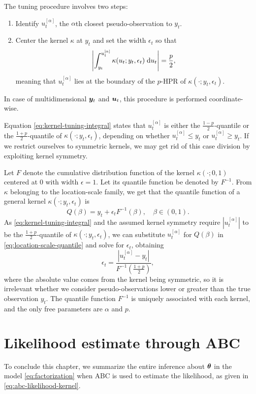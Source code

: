 The tuning procedure involves two steps:
\begin{enumerate}
    \item Identify $u_t^{[\alpha]}$, the $\alpha$th closest pseudo-observation to $y_t$.
    \item Center the kernel $\kappa$ at $y_t$ and set the width $\epsilon_t$ so that
    \begin{equation} \label{eq:kernel-tuning-integral}
    \left| \int_{y_t}^{u_t^{[\alpha]}} \kappa(u_t; y_t, \epsilon_t) \; \mathrm{d}{u_t} \right| = \frac{p}{2},
    \end{equation}
    meaning that $u_t^{[\alpha]}$ lies at the boundary of the $p$-HPR of $\kappa(\cdot; y_t, \epsilon_t)$.
\end{enumerate}
In case of multidimensional $\bm{y}_t$ and $\bm{u}_t$, this procedure is performed coordinate-wise.

Equation \eqref{eq:kernel-tuning-integral} states that $u_t^{[\alpha]}$ is either the $\frac{1-p}{2}$-quantile or the $\frac{1+p}{2}$-quantile of $\kappa(\cdot; y_t, \epsilon_t)$, depending on whether $u_t^{[\alpha]} \leq y_t$ or $u_t^{[\alpha]} \geq y_t$. If we restrict ourselves to symmetric kernels, we may get rid of this case division by exploiting kernel symmetry.

Let $F$ denote the cumulative distribution function of the kernel $\kappa(\cdot; 0, 1)$ centered at 0 with width $\epsilon = 1$. Let its quantile function be denoted by $F^{-1}$. From $\kappa$ belonging to the location-scale family, we get that the quantile function of a general kernel $\kappa(\cdot; y_t, \epsilon_t)$ is
\begin{equation} \label{eq:location-scale-quantile}
Q(\beta) = y_t + \epsilon_t F^{-1}(\beta), \quad \beta \in \left(0, 1\right).
\end{equation}
As \eqref{eq:kernel-tuning-integral} and the assumed kernel symmetry require $\left| u_t^{[\alpha]} \right|$ to be the $\frac{1+p}{2}$-quantile of $\kappa(\cdot; y_t, \epsilon_t)$, we can substitute $u_t^{[\alpha]}$ for $Q(\beta)$ in \eqref{eq:location-scale-quantile} and solve for $\epsilon_t$, obtaining
\begin{equation} \label{eq:kernel-tuning}
\epsilon_t = \frac{\left| u_t^{[\alpha]} - y_t \right|}{F^{-1}(\frac{1+p}{2})},
\end{equation}
where the absolute value comes from the kernel being symmetric, so it is irrelevant whether we consider pseudo-observations lower or greater than the true observation $y_t$. The quantile function $F^{-1}$ is uniquely associated with each kernel, and the only free parameters are $\alpha$ and $p$.


\section{Likelihood estimate through ABC} \label{sec:abcmh}
To conclude this chapter, we summarize the entire inference about $\bm{\theta}$ in the model \eqref{eq:factorization} when ABC is used to estimate the likelihood, as given in \autoref{eq:abc-likelihood-kernel}.